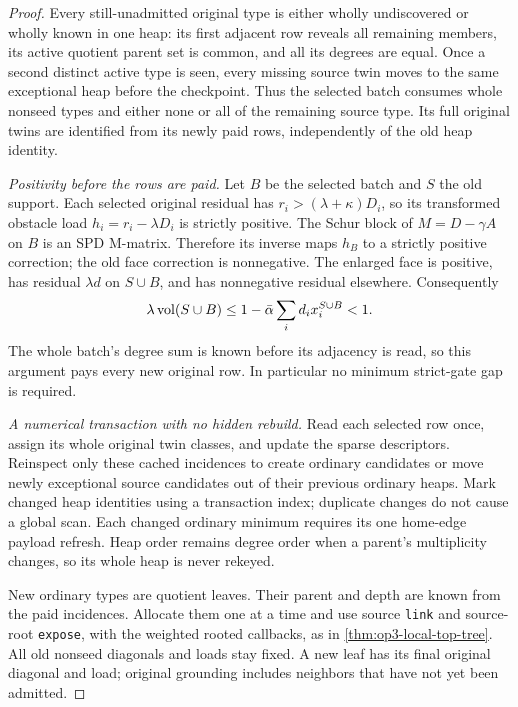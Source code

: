 \begin{proof}
Every still-unadmitted original type is either wholly undiscovered or
wholly known in one heap: its first adjacent row reveals all remaining
members, its active quotient parent set is common, and all its degrees
are equal. Once a second distinct active type is seen, every missing
source twin moves to the same exceptional heap before the checkpoint.
Thus the selected batch consumes whole nonseed types and either none or
all of the remaining source type. Its full original twins are identified
from its newly paid rows, independently of the old heap identity.

\emph{Positivity before the rows are paid.}
Let $B$ be the selected batch and $S$ the old support. Each selected
original residual has $r_i>(\lambda+\kappa)D_i$, so its transformed
obstacle load $h_i=r_i-\lambda D_i$ is strictly positive. The Schur
block of $M=D-\gamma A$ on $B$ is an SPD M-matrix. Therefore its inverse
maps $h_B$ to a strictly positive correction; the old face correction is
nonnegative. The enlarged face is positive, has residual $\lambda d$ on
$S\cup B$, and has nonnegative residual elsewhere. Consequently
\[
 \lambda\operatorname{vol}(S\cup B)
 \leq 1-\bar\alpha\sum_i d_i x_i^{S\cup B}<1.
\]
The whole batch's degree sum is known before its adjacency is read, so
this argument pays every new original row. In particular no minimum
strict-gate gap is required.

\emph{A numerical transaction with no hidden rebuild.}
Read each selected row once, assign its whole original twin classes, and
update the sparse descriptors. Reinspect only these cached incidences to
create ordinary candidates or move newly exceptional source candidates out
of their previous ordinary heaps. Mark changed heap identities using a
transaction index; duplicate changes do not cause a global scan. Each
changed ordinary minimum requires its one home-edge payload refresh. Heap
order remains degree order when a parent's multiplicity changes, so its
whole heap is never rekeyed.

New ordinary types are quotient leaves. Their parent and depth are known
from the paid incidences. Allocate them one at a time and use source
\texttt{link} and source-root \texttt{expose}, with the weighted rooted
callbacks, as in \cref{thm:op3-local-top-tree}. All old nonseed diagonals
and loads stay fixed. A new leaf has its final original diagonal and load;
original grounding includes neighbors that have not yet been admitted.


\end{proof}

